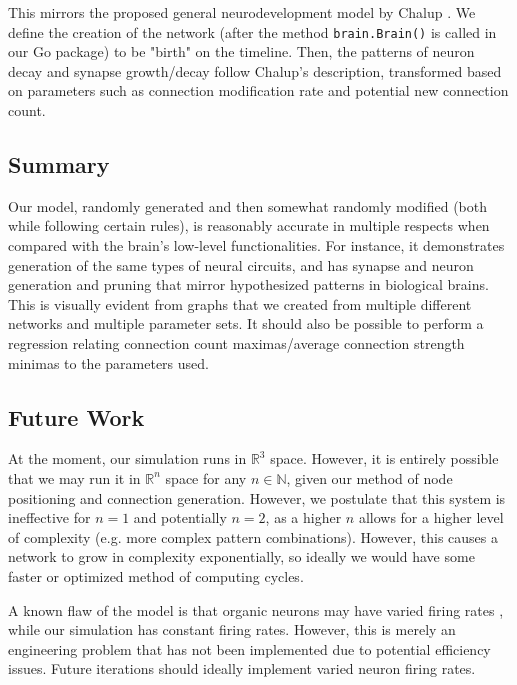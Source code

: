\documentclass[12pt]{article}
\begin{document}
This mirrors the proposed general neurodevelopment model by Chalup \cite{neurodev}.  We define the creation of the network (after the method \texttt{brain.Brain()} is called in our Go package) to be "birth" on the timeline.  Then, the patterns of neuron decay and synapse growth/decay follow Chalup's description, transformed based on parameters such as connection modification rate and potential new connection count.

\subsection{Summary} \label{discussion-summary}

Our model, randomly generated and then somewhat randomly modified (both while following certain rules), is reasonably accurate in multiple respects when compared with the brain's low-level functionalities.  For instance, it demonstrates generation of the same types of neural circuits, and has synapse and neuron generation and pruning that mirror hypothesized patterns in biological brains.  This is visually evident from graphs that we created from multiple different networks and multiple parameter sets.  It should also be possible to perform a regression relating connection count maximas/average connection strength minimas to the parameters used.

\subsection{Future Work} \label{future}

At the moment, our simulation runs in $\mathbb{R}^3$ space.  However, it is entirely possible that we may run it in $\mathbb{R}^n$ space for any $n \in \mathbb{N}$, given our method of node positioning and connection generation.  However, we postulate that this system is ineffective for $n=1$ and potentially $n=2$, as a higher $n$ allows for a higher level of complexity (e.g. more complex pattern combinations).  However, this causes a network to grow in complexity exponentially, so ideally we would have some faster or optimized method of computing cycles.

A known flaw of the model is that organic neurons may have varied firing rates \cite{firingrates}, while our simulation has constant firing rates.  However, this is merely an engineering problem that has not been implemented due to potential efficiency issues.  Future iterations should ideally implement varied neuron firing rates.
\end{document}
